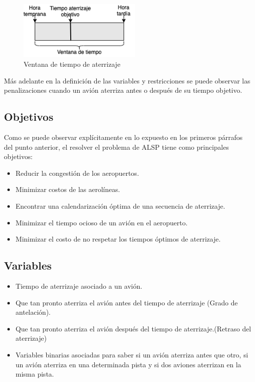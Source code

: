 \documentclass[letter, 10pt]{article}
\begin{document}
\begin{figure}[h]
    \centering
    \includegraphics[width=6cm]{ventanadeTImepo.png}
    \caption{Ventana de tiempo de aterrizaje}
\end{figure} 

Más adelante en la definición de las variables y restricciones se puede observar las penalizaciones cuando un avión aterriza antes o después de su tiempo objetivo.

\subsection{Objetivos}
Como se puede observar explícitamente en lo expuesto en los primeros párrafos del punto anterior, el resolver el problema de ALSP tiene como principales objetivos:
\begin{itemize}
    \item Reducir la congestión de los aeropuertos.
    \item Minimizar costos de las aerolíneas.
    \item Encontrar una calendarización óptima de una secuencia de aterrizaje.
    \item Minimizar el tiempo ocioso de un avión en el aeropuerto.
    \item Minimizar el costo de no respetar los tiempos óptimos de aterrizaje.
\end{itemize}
\subsection{Variables}
\begin{itemize}
    \item Tiempo de aterrizaje asociado a un avión.
    \item Que tan pronto aterriza el avión antes del tiempo de aterrizaje (Grado de antelación).
    \item Que tan pronto aterriza el avión después del tiempo de aterrizaje.(Retraso del aterrizaje)
    \item Variables binarias asociadas para saber si un avión aterriza antes que otro, si un avión aterriza en una determinada pista y si dos aviones aterrizan en la misma pista.
\end{itemize}
\end{document}
